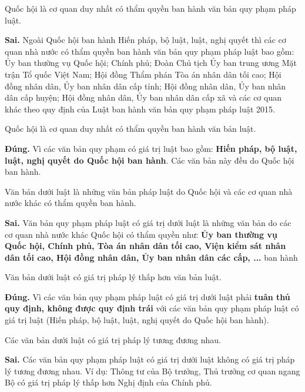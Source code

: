 \begin{ques}
Quốc hội là cơ quan duy nhất có thẩm quyền ban hành văn bản quy phạm pháp luật.
\end{ques}
\begin{ans}
\textbf{Sai.} Ngoài Quốc hội ban hành Hiến pháp, bộ luật, luật, nghị quyết thì các cơ quan nhà nước có thẩm quyền ban hành văn bản quy phạm pháp luật bao gồm: Ủy ban thường vụ Quốc hội; Chính phủ; Đoàn Chủ tịch Ủy ban trung ương Mặt trận Tổ quốc Việt Nam; Hội đồng Thẩm phán Tòa án nhân dân tối cao; Hội đồng nhân dân, Ủy ban nhân dân cấp tỉnh; Hội đồng nhân dân, Ủy ban nhân dân cấp huyện; Hội đồng nhân dân, Ủy ban nhân dân cấp xã và các cơ quan khác theo quy định của Luật ban hành văn bản quy phạm pháp luật 2015.
\end{ans}

\begin{ques}
Quốc hội là cơ quan duy nhất có thẩm quyền ban hành văn bản luật.
\end{ques}
\begin{ans}
\textbf{Đúng.} Vì các văn bản quy phạm có giá trị luật bao gồm: \textbf{Hiến pháp, bộ luật, luật, nghị quyết do Quốc hội ban hành}. Các văn bản này đều do Quốc hội ban hành.
\end{ans}

\begin{ques}
Văn bản dưới luật là những văn bản pháp luật do Quốc hội và các cơ quan nhà nước khác có thẩm quyền ban hành.
\end{ques}
\begin{ans}
\textbf{Sai.} Văn bản quy phạm pháp luật có giá trị dưới luật là những văn bản do các cơ quan nhà nước khác Quốc hội có thẩm quyền như: \textbf{Ủy ban thường vụ Quốc hội, Chính phủ, Tòa án nhân dân tối cao, Viện kiểm sát nhân dân tối cao, Hội đồng nhân dân, Ủy ban nhân dân các cấp, ...} ban hành 
\end{ans}

\begin{ques}
Văn bản dưới luật có giá trị pháp lý thấp hơn văn bản luật.
\end{ques}
\begin{ans}
\textbf{Đúng.} Vì các văn bản quy phạm pháp luật có giá trị dưới luật phải \textbf{tuân thủ quy định, không được quy định trái} với các văn bản quy phạm pháp luật có giá trị luật (Hiến pháp, bộ luật, luật, nghị quyết do Quốc hội ban hành).
\end{ans}

\begin{ques}
Các văn bản dưới luật có giá trị pháp lý tương đương nhau.
\end{ques}
\begin{ans}
\textbf{Sai.} Các văn bản quy phạm pháp luật có giá trị dưới luật không có giá trị pháp lý tương đương nhau. Ví dụ: Thông tư của Bộ trưởng, Thủ trưởng cơ quan ngang Bộ có giá trị pháp lý thấp hơn Nghị định của Chính phủ.
\end{ans}

